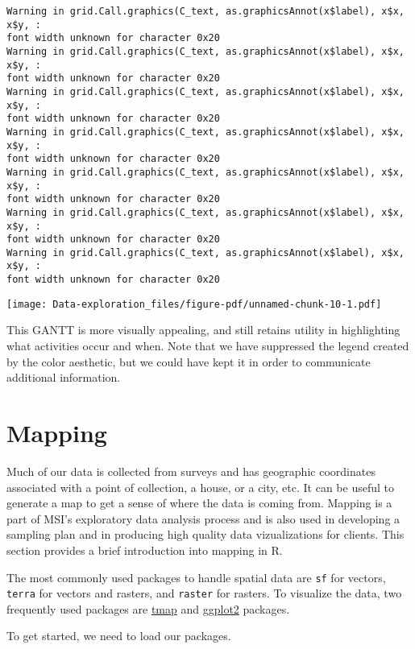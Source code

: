 \documentclass[
  letterpaper,
  DIV=11,
  numbers=noendperiod]{scrreprt}
\begin{document}
\begin{verbatim}
Warning in grid.Call.graphics(C_text, as.graphicsAnnot(x$label), x$x, x$y, :
font width unknown for character 0x20
Warning in grid.Call.graphics(C_text, as.graphicsAnnot(x$label), x$x, x$y, :
font width unknown for character 0x20
Warning in grid.Call.graphics(C_text, as.graphicsAnnot(x$label), x$x, x$y, :
font width unknown for character 0x20
Warning in grid.Call.graphics(C_text, as.graphicsAnnot(x$label), x$x, x$y, :
font width unknown for character 0x20
Warning in grid.Call.graphics(C_text, as.graphicsAnnot(x$label), x$x, x$y, :
font width unknown for character 0x20
Warning in grid.Call.graphics(C_text, as.graphicsAnnot(x$label), x$x, x$y, :
font width unknown for character 0x20
Warning in grid.Call.graphics(C_text, as.graphicsAnnot(x$label), x$x, x$y, :
font width unknown for character 0x20
\end{verbatim}

\texttt{[image: Data-exploration\_files/figure-pdf/unnamed-chunk-10-1.pdf]}

This GANTT is more visually appealing, and still retains utility in
highlighting what activities occur and when. Note that we have
suppressed the legend created by the color aesthetic, but we could have
kept it in order to communicate additional information.

\chapter{Mapping}\label{mapping}

Much of our data is collected from surveys and has geographic
coordinates associated with a point of collection, a house, or a city,
etc. It can be useful to generate a map to get a sense of where the data
is coming from. Mapping is a part of MSI's exploratory data analysis
process and is also used in developing a sampling plan and in producing
high quality data vizualizations for clients. This section provides a
brief introduction into mapping in R.

The most commonly used packages to handle spatial data are \texttt{sf}
for vectors, \texttt{terra} for vectors and rasters, and \texttt{raster}
for rasters. To visualize the data, two frequently used packages are
\href{https://r-tmap.github.io/tmap/}{tmap} and
\href{https://ggplot2.tidyverse.org/}{ggplot2} packages.

To get started, we need to load our packages.
\end{document}

